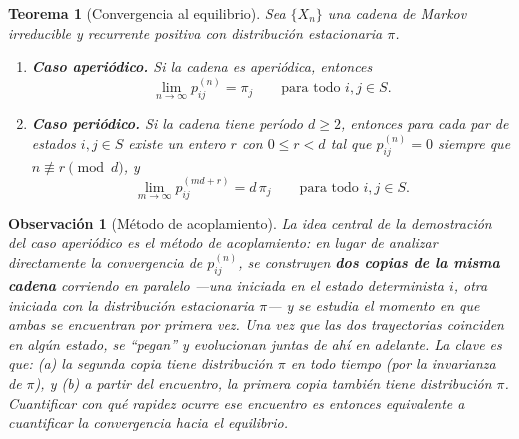 \documentclass[12pt]{book}
\newtheorem{theorem}{Teorema}[chapter]
\newtheorem{remark}{Observación}[chapter]
\begin{document}
\begin{theorem}[Convergencia al equilibrio]
    Sea $\{X_n\}$ una cadena de Markov irreducible y recurrente positiva con distribución estacionaria $\pi$.
    \begin{enumerate}
        \item \textbf{Caso aperiódico.} Si la cadena es aperiódica, entonces
        \[
            \lim_{n\to\infty} p_{ij}^{(n)} = \pi_j \qquad \text{para todo } i, j \in S.
        \]
        \item \textbf{Caso periódico.} Si la cadena tiene período $d \ge 2$, entonces para cada par de estados $i, j \in S$ existe un entero $r$ con $0 \le r < d$ tal que $p_{ij}^{(n)} = 0$ siempre que $n \not\equiv r \pmod{d}$, y
        \[
            \lim_{m\to\infty} p_{ij}^{(md+r)} = d\,\pi_j \qquad \text{para todo } i, j \in S.
        \]
    \end{enumerate}
\end{theorem}

\begin{remark}[Método de acoplamiento]
    La idea central de la demostración del caso aperiódico es el \emph{método de acoplamiento}: en lugar de analizar directamente la convergencia de $p_{ij}^{(n)}$, se construyen \textbf{dos copias de la misma cadena} corriendo en paralelo —una iniciada en el estado determinista $i$, otra iniciada con la distribución estacionaria $\pi$— y se estudia el momento en que ambas se encuentran por primera vez. Una vez que las dos trayectorias coinciden en algún estado, se ``pegan'' y evolucionan juntas de ahí en adelante. La clave es que: (a) la segunda copia tiene distribución $\pi$ en todo tiempo (por la invarianza de $\pi$), y (b) a partir del encuentro, la primera copia también tiene distribución $\pi$. Cuantificar con qué rapidez ocurre ese encuentro es entonces equivalente a cuantificar la convergencia hacia el equilibrio.
\end{remark}
\end{document}
